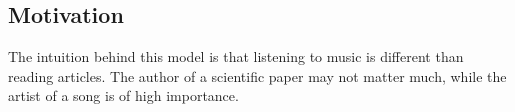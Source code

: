 \subsection*{Motivation}

The intuition behind this model is that listening to music is different than reading articles. The author of a scientific paper may not matter much, while the artist of a song is of high importance.